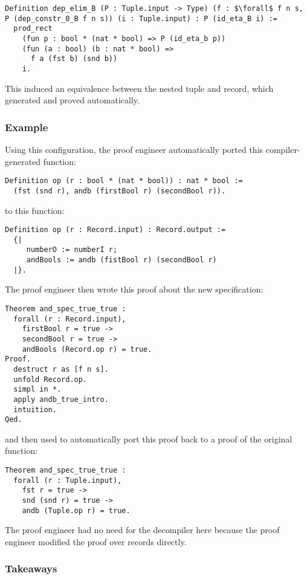 \begin{lstlisting}
Definition dep_elim_B (P : Tuple.input -> Type) (f : $\forall$ f n s, P (dep_constr_0_B f n s)) (i : Tuple.input) : P (id_eta_B i) :=
  prod_rect
    (fun p : bool * (nat * bool) => P (id_eta_b p))
    (fun (a : bool) (b : nat * bool) =>
      f a (fst b) (snd b))
    i.
\end{lstlisting}
This induced an equivalence between the nested tuple and record,
which \toolname generated and proved automatically.

\subsubsection{Example}
Using this configuration, the proof engineer automatically ported this compiler-generated function:

\begin{lstlisting}
Definition op (r : bool * (nat * bool)) : nat * bool :=
  (fst (snd r), andb (firstBool r) (secondBool r)).
\end{lstlisting}
to this function:

\begin{lstlisting}
Definition op (r : Record.input) : Record.output :=
  {|
     numberO := numberI r;
     andBools := andb (fistBool r) (secondBool r)
  |}.
\end{lstlisting}
The proof engineer then wrote this proof about the new specification: %

\begin{lstlisting}
Theorem and_spec_true_true :
  forall (r : Record.input),
    firstBool r = true ->
    secondBool r = true ->
    andBools (Record.op r) = true.
Proof.
  destruct r as [f n s].
  unfold Record.op.
  simpl in *.
  apply andb_true_intro.
  intuition.
Qed.
\end{lstlisting}
and then used \toolname to automatically port this proof back to a proof of the original function: %

\begin{lstlisting}
Theorem and_spec_true_true :
  forall (r : Tuple.input),
    fst r = true ->
    snd (snd r) = true ->
    andb (Tuple.op r) = true.
\end{lstlisting}
The proof engineer had no need for the decompiler here because the proof engineer modified
the proof over records directly. %

\subsubsection{Takeaways}

